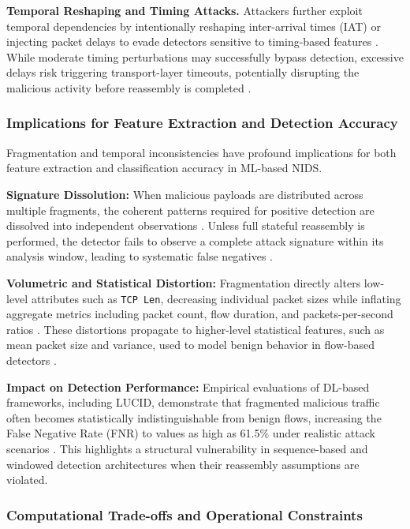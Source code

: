 \textbf{Temporal Reshaping and Timing Attacks.}  
Attackers further exploit temporal dependencies by intentionally reshaping inter-arrival times (IAT) or injecting packet delays to evade detectors sensitive to timing-based features \cite{liu2025hard}. 
While moderate timing perturbations may successfully bypass detection, excessive delays risk triggering transport-layer timeouts, potentially disrupting the malicious activity before reassembly is completed \cite{vitorino2023sok}.

\subsubsection*{Implications for Feature Extraction and Detection Accuracy}

Fragmentation and temporal inconsistencies have profound implications for both feature extraction and classification accuracy in ML-based NIDS.

\textbf{Signature Dissolution:}  
When malicious payloads are distributed across multiple fragments, the coherent patterns required for positive detection are dissolved into independent observations \cite{md2025guardians}. 
Unless full stateful reassembly is performed, the detector fails to observe a complete attack signature within its analysis window, leading to systematic false negatives \cite{abdelaty2021gadot}.

\textbf{Volumetric and Statistical Distortion:}  
Fragmentation directly alters low-level attributes such as \texttt{TCP Len}, decreasing individual packet sizes while inflating aggregate metrics including packet count, flow duration, and packets-per-second ratios \cite{debicha2023adv}. 
These distortions propagate to higher-level statistical features, such as mean packet size and variance, used to model benign behavior in flow-based detectors \cite{cui2023cbseq}.

\textbf{Impact on Detection Performance:}  
Empirical evaluations of DL-based frameworks, including LUCID, demonstrate that fragmented malicious traffic often becomes statistically indistinguishable from benign flows, increasing the False Negative Rate (FNR) to values as high as 61.5\% under realistic attack scenarios \cite{abdelaty2021gadot}. 
This highlights a structural vulnerability in sequence-based and windowed detection architectures when their reassembly assumptions are violated.

\subsubsection*{Computational Trade-offs and Operational Constraints}

